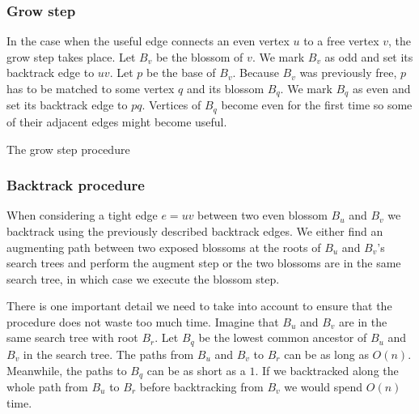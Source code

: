 \subsubsection*{Grow step}

In the case when the useful edge connects an even vertex $u$ to a free vertex $v$, the grow step takes place. Let $B_v$ be the blossom of $v$. We mark $B_v$ as odd and set its backtrack edge to $uv$. Let $p$ be the base of $B_v$. Because $B_v$ was previously free, $p$ has to be matched to some vertex $q$ and its blossom $B_q$. We mark $B_q$ as even and set its backtrack edge to $pq$. Vertices of $B_q$ become even for the first time so some of their adjacent edges might become useful.

\begin{algorithm}
\caption{The grow step procedure}\label{alg:grow_step}
\begin{algorithmic}[1]
\EndProcedure
\end{algorithmic}
\end{algorithm}

\subsubsection*{Backtrack procedure}

When considering a tight edge $e=uv$ between two even blossom $B_u$ and $B_v$ we backtrack using the previously described backtrack edges. We either find an augmenting path between two exposed blossoms at the roots of $B_u$ and $B_v$'s search trees and perform the augment step or the two blossoms are in the same search tree, in which case we execute the blossom step. 

There is one important detail we need to take into account to ensure that the procedure does not waste too much time. Imagine that $B_u$ and $B_v$ are in the same search tree with root $B_r$. Let $B_q$ be the lowest common ancestor of $B_u$ and $B_v$ in the search tree. The paths from $B_u$ and $B_v$ to $B_r$ can be as long as $O(n)$. Meanwhile, the paths to $B_q$ can be as short as a $1$. If we backtracked along the whole path from $B_u$ to $B_r$ before backtracking from $B_v$ we would spend $O(n)$ time. 

